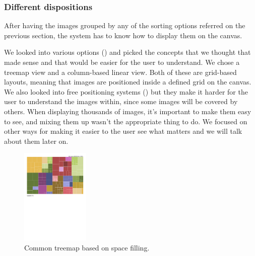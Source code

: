 \subsubsection{Different dispositions}

After having the images grouped by any of the sorting options referred on the previous section, the system has to know how to display them on the canvas.

We looked into various options (\cite{Bederson:2001:PZI:502348.502359,Bruls:2000p3517,Chen:1998p2344,Girgensohn:2010,Heesch:2004p2675,Hsu:2009p2696,Porta:2006p416,Rodden:2001p731,Schaefer:2010p1871,Strong:2009p413}) and picked the concepts that we thought that made sense and that would be easier for the user to understand. We chose a treemap view and a column-based linear view. Both of these are grid-based layouts, meaning that images are positioned inside a defined grid on the canvas. We also looked into free positioning systems (\cite{Girgensohn:2010,Rodden:2001p731,Schaefer:2010p1871,Strong:2009p413}) but they make it harder for the user to understand the images within, since some images will be covered by others. When displaying thousands of images, it's important to make them easy to see, and mixing them up wasn't the appropriate thing to do. We focused on other ways for making it easier to the user see what matters and we will talk about them later on.

\begin{figure}
	\vspace{-23pt}
	\begin{center}
		\includegraphics[width=0.29\textwidth]{Figures/Protovis-treemap.pdf}
	\end{center}
	\vspace{-20pt}
	\caption{Common treemap based on space filling.}
	\vspace{-5pt}
	\label{fig:commontreemap}
\end{figure}

